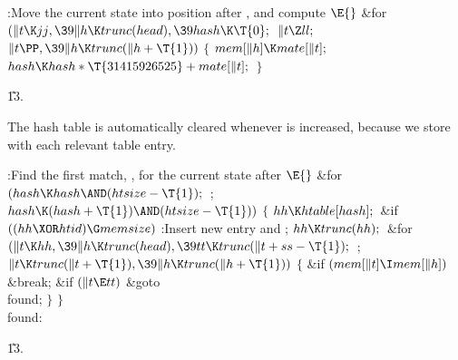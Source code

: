 \B{}:Move the current state into position after , and
compute \X${}\E{}$\6
\&{for} ${}(\|t\K\\{jj},\39\|h\K\\{trunc}(\\{head}),\39\\{hash}\K\T{0};{}$ ${}%
\|t\Z\\{ll};{}$ ${}\|t\PP,\39\|h\K\\{trunc}(\|h+\T{1})){}$\5
${}\{{}$\1\6
${}\\{mem}[\|h]\K\\{mate}[\|t];{}$\6
${}\\{hash}\K\\{hash}*\T{31415926525}+\\{mate}[\|t];{}$\6
\4${}\}{}$\2\par
\U13.\fi

The hash table is automatically cleared whenever  is
increased,
because we store  with each relevant table entry.

\Y\B\4:Find the first match, , for the current state after \X${}\E{}$\6
\&{for} ${}(\\{hash}\K\\{hash}\AND(\\{htsize}-\T{1});{}$  ; ${}\\{hash}\K(%
\\{hash}+\T{1})\AND(\\{htsize}-\T{1})){}$\5
${}\{{}$\1\6
${}\\{hh}\K\\{htable}[\\{hash}];{}$\6
\&{if} ${}((\\{hh}\XOR\\{htid})\G\\{memsize}){}$\1\5
:Insert new entry and \X;\2\6
${}\\{hh}\K\\{trunc}(\\{hh});{}$\6
\&{for} ${}(\|t\K\\{hh},\39\|h\K\\{trunc}(\\{head}),\39\\{tt}\K\\{trunc}(\|t+%
\\{ss}-\T{1});{}$  ; ${}\|t\K\\{trunc}(\|t+\T{1}),\39\|h\K\\{trunc}(\|h+%
\T{1})){}$\5
${}\{{}$\1\6
\&{if} ${}(\\{mem}[\|t]\I\\{mem}[\|h]){}$\1\5
\&{break};\2\6
\&{if} ${}(\|t\E\\{tt}){}$\1\5
\&{goto} \\{found};\2\6
\4${}\}{}$\2\6
\4${}\}{}$\2\6
\\{found}:\par
\U13.\fi

